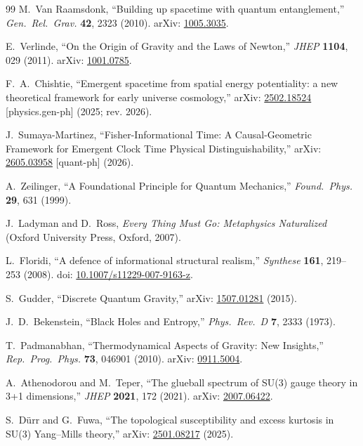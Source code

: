 \documentclass[12pt,a4paper,twoside]{article}
\theoremstyle{plain}
\theoremstyle{definition}
\theoremstyle{remark}
\begin{document}
\begin{thebibliography}{99}
M.~Van Raamsdonk,
``Building up spacetime with quantum entanglement,''
\emph{Gen.\ Rel.\ Grav.} \textbf{42}, 2323 (2010).
arXiv: \href{https://arxiv.org/abs/1005.3035}{1005.3035}.

E.~Verlinde,
``On the Origin of Gravity and the Laws of Newton,''
\emph{JHEP} \textbf{1104}, 029 (2011).
arXiv: \href{https://arxiv.org/abs/1001.0785}{1001.0785}.

F.~A.~Chishtie,
``Emergent spacetime from spatial energy potentiality:
a new theoretical framework for early universe cosmology,''
arXiv: \href{https://arxiv.org/abs/2502.18524}{2502.18524}
[physics.gen-ph] (2025; rev. 2026).

J.~Sumaya-Martinez,
``Fisher-Informational Time:
A Causal-Geometric Framework for Emergent Clock Time Physical Distinguishability,''
arXiv: \href{https://arxiv.org/abs/2605.03958}{2605.03958}
[quant-ph] (2026).

A.~Zeilinger,
``A Foundational Principle for Quantum Mechanics,''
\emph{Found.\ Phys.} \textbf{29}, 631 (1999).

J.~Ladyman and D.~Ross,
\emph{Every Thing Must Go: Metaphysics Naturalized}
(Oxford University Press, Oxford, 2007).

L.~Floridi,
``A defence of informational structural realism,''
\emph{Synthese} \textbf{161}, 219--253 (2008).
doi: \href{https://doi.org/10.1007/s11229-007-9163-z}{10.1007/s11229-007-9163-z}.

S.~Gudder,
``Discrete Quantum Gravity,''
arXiv: \href{https://arxiv.org/abs/1507.01281}{1507.01281} (2015).

J.~D.~Bekenstein,
``Black Holes and Entropy,''
\emph{Phys.\ Rev.\ D} \textbf{7}, 2333 (1973).

T.~Padmanabhan,
``Thermodynamical Aspects of Gravity: New Insights,''
\emph{Rep.\ Prog.\ Phys.} \textbf{73}, 046901 (2010).
arXiv: \href{https://arxiv.org/abs/0911.5004}{0911.5004}.

A.~Athenodorou and M.~Teper,
``The glueball spectrum of SU(3) gauge theory in 3+1 dimensions,''
\emph{JHEP} \textbf{2021}, 172 (2021).
arXiv: \href{https://arxiv.org/abs/2007.06422}{2007.06422}.

S.~D\"urr and G.~Fuwa,
``The topological susceptibility and excess kurtosis in SU(3) Yang--Mills
theory,''
arXiv: \href{https://arxiv.org/abs/2501.08217}{2501.08217} (2025).


\end{thebibliography}
\end{document}
